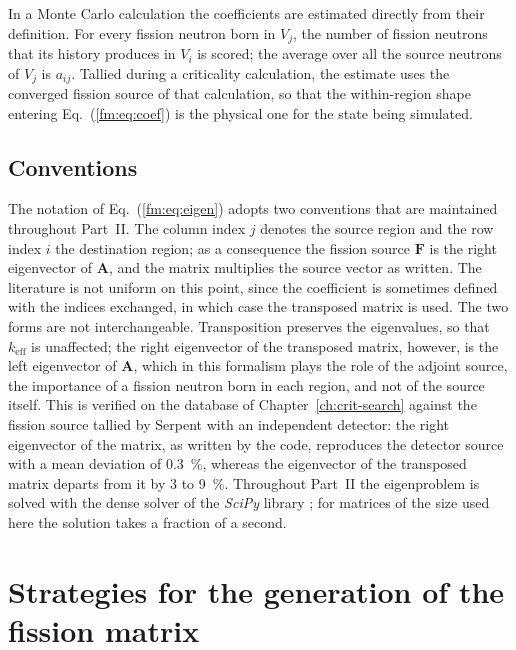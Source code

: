 In a Monte Carlo calculation the coefficients are estimated directly from their
definition. For every fission neutron born in $V_j$, the number of fission
neutrons that its history produces in $V_i$ is scored; the average over all the
source neutrons of $V_j$ is $a_{ij}$. Tallied during a criticality calculation,
the estimate uses the converged fission source of that calculation, so that the
within-region shape entering Eq.~(\ref{fm:eq:coef}) is the physical one for
the state being simulated.

\subsection{Conventions}

The notation of Eq.~(\ref{fm:eq:eigen}) adopts two conventions that are
maintained throughout Part~II. The column index $j$ denotes the source region
and the row index $i$ the destination region; as a consequence the fission
source $\mathbf F$ is the right eigenvector of $\mathbf A$, and the matrix
multiplies the source vector as written. The literature is not uniform on this
point, since the coefficient is sometimes defined with the indices exchanged,
in which case the transposed matrix is used. The two forms are not
interchangeable. Transposition preserves the eigenvalues, so that
$k_{\mathrm{eff}}$ is unaffected; the right eigenvector of the transposed
matrix, however, is the left eigenvector of $\mathbf A$, which in this
formalism plays the role of the adjoint source, the importance of a fission
neutron born in each region, and not of the source itself. This is
verified on the database of Chapter~\ref{ch:crit-search} against the fission
source tallied by Serpent with an independent detector: the right eigenvector
of the matrix, as written by the code, reproduces the detector source with a
mean deviation of \SI{0.3}{\percent}, whereas the eigenvector of the transposed
matrix departs from it by 3 to \SI{9}{\percent}. Throughout Part~II the
eigenproblem is solved with the dense solver of the \textit{SciPy} library
\cite{VirtanenSciPy2020}; for matrices of the size used here the solution takes
a fraction of a second.

\section{Strategies for the generation of the fission matrix}\label{fm:sec:generation}

